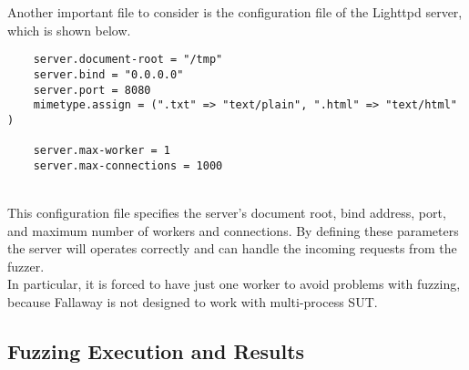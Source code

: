 Another important file to consider is the configuration file of the Lighttpd server, which is shown below.\\
\begin{lstlisting}
    server.document-root = "/tmp"
    server.bind = "0.0.0.0"
    server.port = 8080
    mimetype.assign = (".txt" => "text/plain", ".html" => "text/html" )

    server.max-worker = 1 
    server.max-connections = 1000
\end{lstlisting}
\phantom{}\\
This configuration file specifies the server's document root, bind address, port, and maximum number of workers and connections. By defining these parameters the server will operates correctly and can handle the incoming requests from the fuzzer.
\\In particular, it is forced to have just one worker to avoid problems with fuzzing, because Fallaway is not designed to work with multi-process SUT.
\subsection{Fuzzing Execution and Results}

